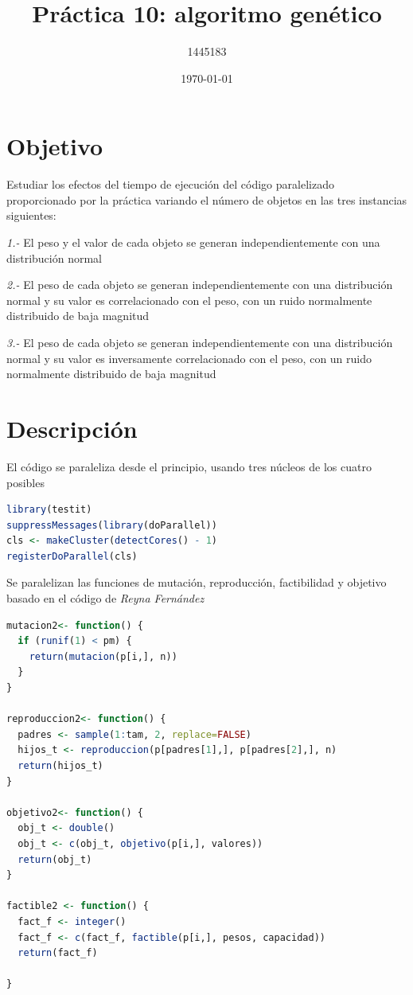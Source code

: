 \documentclass{article}
\author{1445183}
\title{Práctica 10: algoritmo genético}
\date{\today}
\begin{document}
\maketitle

\section{Objetivo}
Estudiar los efectos del tiempo de ejecución del código paralelizado proporcionado por la práctica \cite{elisaweb10} variando el número de objetos en las tres instancias siguientes: \par
\textit{1.-} El peso y el valor de cada objeto se generan independientemente con una distribución normal \par
\textit{2.-} El peso de cada objeto se generan independientemente con una distribución normal y su valor es correlacionado con el peso, con un ruido normalmente distribuido de baja magnitud \par
\textit{3.-} El peso de cada objeto se generan independientemente con una distribución normal y su valor es inversamente correlacionado con el peso, con un ruido normalmente distribuido de baja magnitud

\section{Descripción}

El código se paraleliza desde el principio, usando tres núcleos de los cuatro posibles

\begin{lstlisting}[language=R]
library(testit)
suppressMessages(library(doParallel))
cls <- makeCluster(detectCores() - 1)
registerDoParallel(cls)
\end{lstlisting}

Se paralelizan las funciones de mutación, reproducción, factibilidad y objetivo basado en el código de \textit{Reyna Fernández} \cite{yess10}
\begin{lstlisting}[language=R]
mutacion2<- function() { 
  if (runif(1) < pm) {
    return(mutacion(p[i,], n))
  }
}

reproduccion2<- function() {
  padres <- sample(1:tam, 2, replace=FALSE)
  hijos_t <- reproduccion(p[padres[1],], p[padres[2],], n)
  return(hijos_t)
}

objetivo2<- function() {
  obj_t <- double()
  obj_t <- c(obj_t, objetivo(p[i,], valores))
  return(obj_t)
}

factible2 <- function() {
  fact_f <- integer()
  fact_f <- c(fact_f, factible(p[i,], pesos, capacidad))
  return(fact_f)
  
}

\end{lstlisting}
\end{document}
